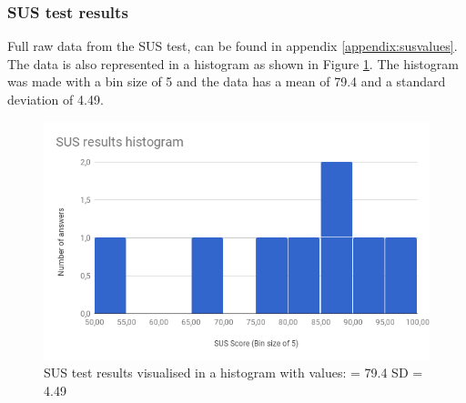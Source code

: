 \subsubsection{SUS test results}
Full raw data from the SUS test, can be found in appendix \ref{appendix:susvalues}. The data is also represented in a histogram as shown in Figure \ref{fig:histogram}. The histogram was made with a bin size of 5 and the data has a mean of 79.4 and a standard deviation of 4.49.

\begin{figure}[H]
    \centering
    \includegraphics[width=0.75\linewidth]{InteraktionsDesign/Assets/Resultater/histogram_new.png}
    \caption{SUS test results visualised in a histogram with values:
        \mu  = 79.4  \newline SD = 4.49}
    \label{fig:histogram}
\end{figure}

